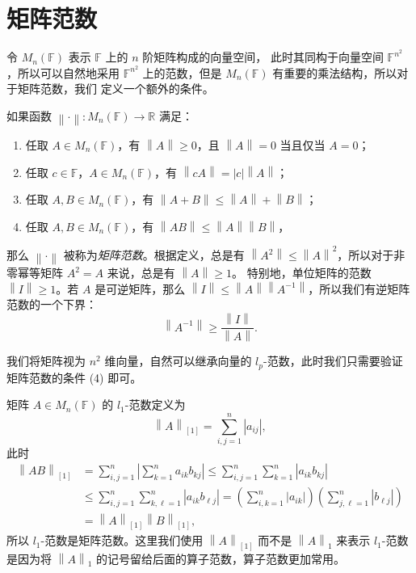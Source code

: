 \documentclass[fontset=none,zihao=-4]{Notes}
\newcommand{\norm}[1]{\left\lVert#1\right\rVert}
\begin{document}
\section{矩阵范数}

令 $M_n(\mathbb{F})$ 表示 $\mathbb{F}$ 上的 $n$ 阶矩阵构成的向量空间，
此时其同构于向量空间 $\mathbb{F}^{n^2}$，所以可以自然地采用 $\mathbb{F}^{n^2}$
上的范数，但是 $M_n(\mathbb{F})$ 有重要的乘法结构，所以对于矩阵范数，我们
定义一个额外的条件。

如果函数 $\norm{\cdot}:M_n(\mathbb{F})\to\mathbb{R}$ 满足：
\begin{enumerate}
  \item 任取 $A\in M_n(\mathbb{F})$，有 $\norm{A}\geq 0$，且 $\norm{A}=0$ 当且仅当 $A=0$；
  \item 任取 $c\in\mathbb{F}$，$A\in M_n(\mathbb{F})$，有 $\norm{cA}=|c|\norm{A}$；
  \item 任取 $A,B\in M_n(\mathbb{F})$，有 $\norm{A+B}\leq\norm{A}+\norm{B}$；
  \item 任取 $A,B\in M_n(\mathbb{F})$，有 $\norm{AB}\leq\norm{A}\norm {B}$，
\end{enumerate}
那么 $\norm{\cdot}$ 被称为\emph{矩阵范数}。根据定义，总是有
$\norm{A^2}\leq\norm{A}^2$，所以对于非零幂等矩阵 $A^2=A$ 来说，总是有 $\norm{A}\geq 1$。
特别地，单位矩阵的范数 $\norm{I}\ge 1$。若 $A$ 是可逆矩阵，那么
$\norm{I}\leq\norm{A}\norm{A^{-1}}$，所以我们有逆矩阵范数的一个下界：
\[
  \norm{A^{-1}}\geq\frac{\norm{I}}{\norm{A}}.  
\]

我们将矩阵视为 $n^2$ 维向量，自然可以继承向量的 $l_p$-范数，此时我们只需要验证
矩阵范数的条件 (4) 即可。

\begin{example}
  矩阵 $A\in M_n(\mathbb{F})$ 的 $l_1$-范数定义为
  \[
    \norm{A}_{[1]}=\sum_{i,j=1}^n|a_{ij}|,  
  \]
  此时
  \begin{align*}
    \norm{AB}_{[1]}&=\sum_{i,j=1}^n\left|\sum_{k=1}^n a_{ik}b_{kj}\right|\leq
    \sum_{i,j=1}^n\sum_{k=1}^n|a_{ik}b_{kj}|\\
    &\leq \sum_{i,j=1}^n\sum_{k,\ell=1}^n|a_{ik}b_{\ell j}|=
    \left(\sum_{i,k=1}^n|a_{ik}|\right)\left(\sum_{j,\ell=1}^n|b_{\ell j}|\right)
    \\
    &=\norm{A}_{[1]}\norm{B}_{[1]},
  \end{align*}
  所以 $l_1$-范数是矩阵范数。这里我们使用 $\norm{A}_{[1]}$ 而不是 $\norm{A}_1$ 来表示
  $l_1$-范数是因为将 $\norm{A}_1$ 的记号留给后面的算子范数，算子范数更加常用。
\end{example}
\end{document}
